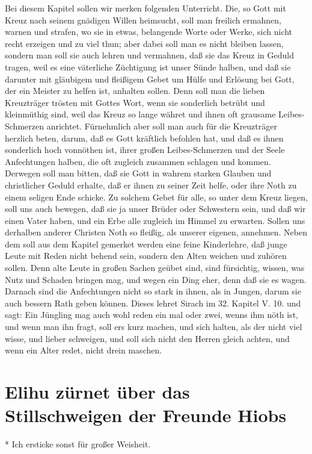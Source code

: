 Bei diesem Kapitel sollen wir merken folgenden Unterricht. Die, so Gott mit Kreuz nach seinem gnädigen Willen heimsucht, soll man freilich ermahnen, warnen und strafen, wo sie in etwas, belangende Worte oder Werke, sich nicht recht erzeigen und zu viel thun; aber dabei soll man es nicht bleiben lassen, sondern man soll sie auch lehren und vermahnen, daß sie das Kreuz in Geduld tragen, weil es eine väterliche Züchtigung ist unser Sünde halben, und daß sie darunter mit gläubigem und fleißigem Gebet um Hülfe und Erlösung bei Gott, der ein Meister zu helfen ist, anhalten sollen. Denn soll man die lieben Kreuzträger trösten mit Gottes Wort, wenn sie sonderlich betrübt und kleinmüthig sind, weil das Kreuz so lange währet und ihnen oft grausame Leibes-Schmerzen anrichtet. Fürnehmlich aber soll man auch für die Kreuzträger herzlich beten, darum, daß es Gott kräftlich befohlen hat, und daß es ihnen sonderlich hoch vonnöthen ist, ihrer großen Leibes-Schmerzen und der Seele Anfechtungen halben, die oft zugleich zusammen schlagen und kommen. Derwegen soll man bitten, daß sie Gott in wahrem starken Glauben und christlicher Geduld erhalte, daß er ihnen zu seiner Zeit helfe, oder ihre Noth zu einem seligen Ende schicke. Zu solchem Gebet für alle, so unter dem Kreuz liegen, soll uns auch bewegen, daß sie ja unser Brüder oder Schwestern sein, und daß wir einen Vater haben, und ein Erbe alle zugleich im Himmel zu erwarten. Sollen uns derhalben anderer Christen Noth so fleißig, als unserer eigenen, annehmen. Neben dem soll aus dem Kapitel gemerket werden eine feine Kinderlehre, daß junge Leute mit Reden nicht behend sein, sondern den Alten weichen und zuhören sollen. Denn alte Leute in großen Sachen geübet sind, sind fürsichtig, wissen, was Nutz und Schaden bringen mag, und wegen ein Ding eher, denn daß sie es wagen. Darnach sind die Anfechtungen nicht so stark in ihnen, als in Jungen, darum sie auch bessern Rath geben können. Dieses lehret Sirach im 32. Kapitel V. 10. und sagt: Ein Jüngling mag auch wohl reden ein mal oder zwei, wenns ihm nöth ist, und wenn man ihn fragt, soll ers kurz machen, und sich halten, als der nicht viel wisse, und lieber schweigen, und soll sich nicht den Herren gleich achten, und wenn ein Alter redet, nicht drein maschen.

\section{Elihu zürnet über das Stillschweigen der Freunde Hiobs}
* Ich ersticke sonst für großer Weisheit.

